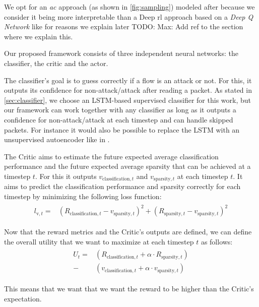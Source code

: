 \documentclass[conference]{IEEEtran}
\newcommand\note[2]{{\color{#1}#2}}
\newcommand\todo[1]{{\note{red}{TODO: #1}}}
\begin{document}
We opt for an \emph{\gls{ac}} approach (as shown in \autoref{fig:sampling}) modeled after \cite{mnih_asynchronous_2016} because we consider it being more interpretable than a Deep \gls{rl} approach based on a \textit{Deep Q Network} like \cite{mnih_playing_2013} for reasons we explain later \todo{Max: Add ref to the section where we explain this}. 

Our proposed framework consists of three independent neural networks: the classifier, the critic and the actor. 

The classifier's goal is to guess correctly if a flow is an attack or not. For this, it outputs its confidence for non-attack/attack after reading a packet. As stated in \autoref{sec:classifier}, we choose an LSTM-based supervised classifier for this work, but our framework can work together with any classifier as long as it outputs a confidence for non-attack/attack at each timestep and can handle skipped packets. For instance it would also be possible to replace the LSTM with an unsupervised autoencoder like in \cite{mirsky_kitsune_2018}. 

The Critic aims to estimate the future expected average classification performance and the future expected average sparsity that can be achieved at a timestep $t$. For this it outputs $v_{\text{classification},t}$ and $v_{\text{sparsity},t}$ at each timestep $t$. It aims to predict the classification performance and sparsity correctly for each timestep by minimizing the following loss function:
\begin{align}
\begin{split}
l_{\text{v},t} =& \left(R_{\text{classification},t} - v_{\text{sparsity},t}\right)^2 + \left(R_{\text{sparsity},t} - v_{\text{sparsity},t}\right)^2
\end{split}
\end{align}

Now that the reward metrics and the Critic's outputs are defined, we can define the overall utility that we want to maximize at each timestep $t$ as follows:
\begin{align}
\begin{split}
U_t =& \left(R_{\text{classification},t} + \alpha \cdot R_{\text{sparsity},t}\right) \\
- & \left(v_{\text{classification},t} + \alpha \cdot v_{\text{sparsity},t}\right)
\end{split}
\end{align}

This means that we want that we want the reward to be higher than the Critic's expectation. 
\end{document}

